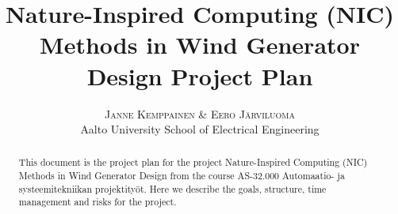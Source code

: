 \documentclass[twoside]{article}
\title{\vspace{-15mm}\fontsize{24pt}{10pt}\selectfont\textbf{Nature-Inspired Computing (NIC) Methods in Wind Generator Design Project Plan}} %
\author{
\large
\textsc{Janne Kemppainen \& Eero J\"arviluoma}\\[2mm] %
\normalsize Aalto University School of Electrical Engineering \\ %
\vspace{-5mm}
}
\date{}
\begin{document}
\maketitle %

\thispagestyle{fancy} %


\begin{abstract}

\noindent This document is the project plan for the project Nature-Inspired Computing (NIC) Methods in Wind Generator Design from the course AS-32.000 Automaatio- ja systeemitekniikan projektity\"ot. Here we describe the goals, structure, time management and risks for the project.

\end{abstract}

\end{document}
